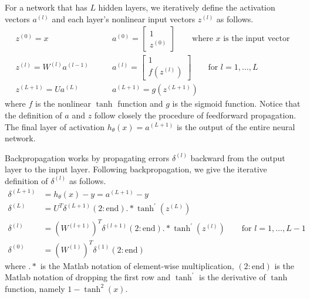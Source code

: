 \documentclass[letterpaper]{article}
\begin{document}
For a network that has $L$ hidden layers, we iteratively define the activation vectors $a^{(l)}$ and each layer's nonlinear input vectors $z^{(l)}$ as follows.
\begin{equation}\label{eq:activation}
\begin{split}
z^{(0)} = x
& \qquad 
a^{(0)} =
\begin{bmatrix}
1 \\ z^{(0)}
\end{bmatrix} 
\qquad
\textrm{where } x \textrm{ is the input vector} \\
z^{(l)} = W^{(l)} a^{(l-1)}
& \qquad
a^{(l)} = 
\begin{bmatrix}
1 \\ f(z^{(l)})
\end{bmatrix}
\qquad
\textrm{for } l = 1, \dots, L \\
z^{(L+1)} = U a^{(L)}
& \qquad
a^{(L+1)} = g(z^{(L+1)})
\end{split}
\end{equation}
where $f$ is the nonlinear $\tanh$ function and $g$ is the sigmoid function. Notice that the definition of $a$ and $z$ follow closely the procedure of feedforward propagation. The final layer of activation $h_\theta(x) = a^{(L+1)}$ is the output of the entire neural network.

\vspace{0.1cm}

Backpropagation works by propagating errors $\delta^{(l)}$ backward from the output layer to the input layer. Following backpropagation, we give the iterative definition of $\delta^{(l)}$ as follows.
\begin{equation}
\begin{split}
\delta^{(L+1)} &= h_\theta(x) - y = a^{(L+1)} - y \\
\delta^{(L)} &= U^T \delta^{(L+1)}(2:\textrm{end}).* \tanh^\prime (z^{(L)}) \\
\delta^{(l)} &= (W^{(l+1)})^T \delta^{(l+1)} (2:\textrm{end}) .* \tanh^\prime
(z^{(l)}) \qquad \textrm{for } l = 1, \dots, L-1 \\
\delta^{(0)} & = (W^{(1)})^T \delta^{(1)} (2:\textrm{end})
\end{split}
\end{equation}
where $.*$ is the Matlab notation of element-wise multiplication, $(2:\textrm{end})$ is the Matlab notation of dropping the first row and $\tanh^\prime$ is the derivative of $\tanh$ function, namely $1 - \tanh^2(x)$.

\vspace{0.1cm}
\end{document}
